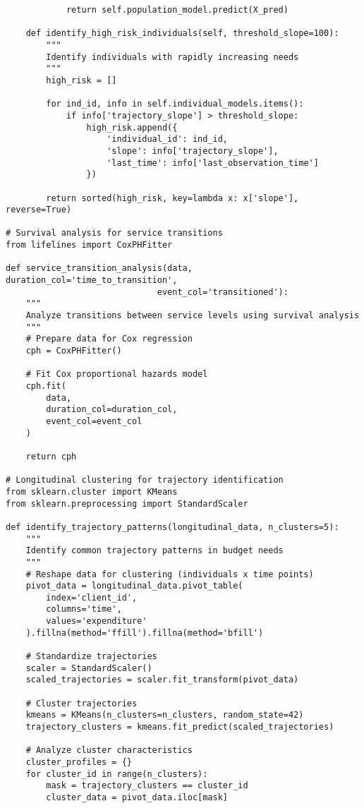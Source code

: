 \begin{lstlisting}
            return self.population_model.predict(X_pred)
    
    def identify_high_risk_individuals(self, threshold_slope=100):
        """
        Identify individuals with rapidly increasing needs
        """
        high_risk = []
        
        for ind_id, info in self.individual_models.items():
            if info['trajectory_slope'] > threshold_slope:
                high_risk.append({
                    'individual_id': ind_id,
                    'slope': info['trajectory_slope'],
                    'last_time': info['last_observation_time']
                })
        
        return sorted(high_risk, key=lambda x: x['slope'], reverse=True)

# Survival analysis for service transitions
from lifelines import CoxPHFitter

def service_transition_analysis(data, duration_col='time_to_transition',
                              event_col='transitioned'):
    """
    Analyze transitions between service levels using survival analysis
    """
    # Prepare data for Cox regression
    cph = CoxPHFitter()
    
    # Fit Cox proportional hazards model
    cph.fit(
        data, 
        duration_col=duration_col, 
        event_col=event_col
    )
    
    return cph

# Longitudinal clustering for trajectory identification
from sklearn.cluster import KMeans
from sklearn.preprocessing import StandardScaler

def identify_trajectory_patterns(longitudinal_data, n_clusters=5):
    """
    Identify common trajectory patterns in budget needs
    """
    # Reshape data for clustering (individuals x time points)
    pivot_data = longitudinal_data.pivot_table(
        index='client_id', 
        columns='time', 
        values='expenditure'
    ).fillna(method='ffill').fillna(method='bfill')
    
    # Standardize trajectories
    scaler = StandardScaler()
    scaled_trajectories = scaler.fit_transform(pivot_data)
    
    # Cluster trajectories
    kmeans = KMeans(n_clusters=n_clusters, random_state=42)
    trajectory_clusters = kmeans.fit_predict(scaled_trajectories)
    
    # Analyze cluster characteristics
    cluster_profiles = {}
    for cluster_id in range(n_clusters):
        mask = trajectory_clusters == cluster_id
        cluster_data = pivot_data.iloc[mask]
        

\end{lstlisting}
